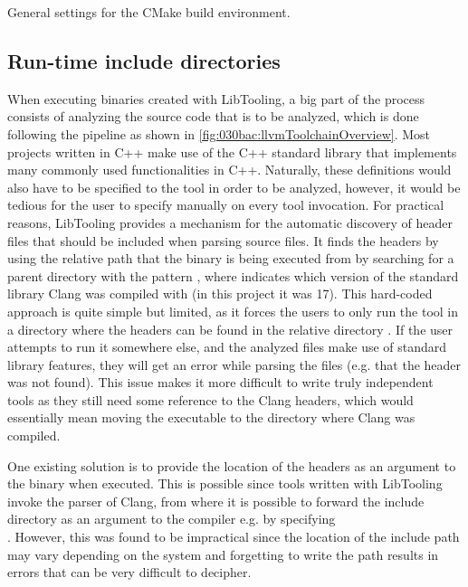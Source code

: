 \begin{listing}[H]
    \caption{General settings for the CMake build environment.}
    \label{code:080dev:cmake_base_settings}
\end{listing}

\subsection{Run-time include directories}\label{subsec:080dev:rt_include}
When executing binaries created with LibTooling, a big part of the process consists of analyzing the source code that is to be analyzed, which is done following the pipeline as shown in \cref{fig:030bac:llvmToolchainOverview}.
Most projects written in C++ make use of the C++ standard library that implements many commonly used functionalities in C++. Naturally, these definitions would also have to be specified to the tool in order to be analyzed, however, it would be tedious for the user to specify manually on every tool invocation.
For practical reasons, LibTooling provides a mechanism for the automatic discovery of header files that should be included when parsing source files. It finds the headers by using the relative path that the binary is being executed from by searching for a parent directory with the pattern , where  indicates which version of the standard library Clang was compiled with (in this project it was 17).
This hard-coded approach is quite simple but limited, as it forces the users to only run the tool in a directory where the headers can be found in the relative directory .
If the user attempts to run it somewhere else, and the analyzed files make use of standard library features, they will get an error while parsing the files (e.g. that the header  was not found).
This issue makes it more difficult to write truly independent tools as they still need some reference to the Clang headers, which would essentially mean moving the executable to the directory where Clang was compiled.

One existing solution is to provide the location of the headers as an argument to the binary when executed. This is possible since tools written with LibTooling invoke the parser of Clang, from where it is possible to forward the include directory as an argument to the compiler e.g. by specifying\\.
However, this was found to be impractical since the location of the include path may vary depending on the system and forgetting to write the path results in errors that can be very difficult to decipher.

